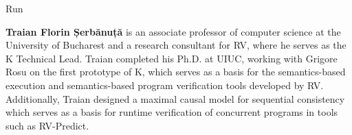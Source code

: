 \begin{sitedescription}{Run}
\begin{compactitem}
\item{\bf Traian Florin Șerbănuță} is an associate professor of computer science
at the University of Bucharest and a research consultant for RV, where he serves
as the K Technical Lead.
Traian completed his Ph.D. at UIUC, working with Grigore Rosu
on the first prototype of K, which serves as a basis for the semantics-based execution
and semantics-based program verification tools developed by RV.
Additionally, Traian designed a maximal causal model for sequential consistency
which serves as a basis for runtime verification of concurrent programs in tools
such as RV-Predict.

\end{compactitem}

\end{sitedescription}

